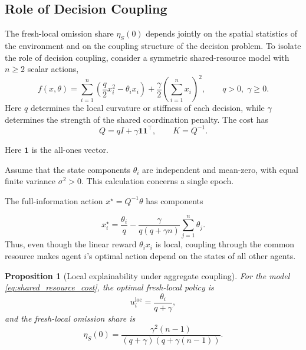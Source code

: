 \documentclass[11pt]{article}
\newtheorem{proposition}{Proposition}
\begin{document}
\subsection{Role of Decision Coupling}
\label{subsec:coupling_example}

The fresh-local omission share $\eta_S(0)$ depends jointly on the
spatial statistics of the environment and on the coupling structure of the
decision problem. To isolate the role of decision coupling, consider a
symmetric shared-resource model with $n\ge2$ scalar actions,
\begin{equation}
    f(x,\theta)
    =
    \sum_{i=1}^{n}
    \left(
        \frac{q}{2}x_i^2-\theta_i x_i
    \right)
    +
    \frac{\gamma}{2}
    \left(
        \sum_{i=1}^{n}x_i
    \right)^2,
    \qquad
    q>0,\;\gamma\ge0.
    \label{eq:shared_resource_cost}
\end{equation}
Here $q$ determines the local curvature or stiffness of each decision, while
$\gamma$ determines the strength of the shared coordination penalty. The cost has
\begin{equation}
    Q
    =
    qI+\gamma\mathbf{1}\mathbf{1}^\top,
    \qquad
    K=Q^{-1}.
    \label{eq:shared_resource_Q}
\end{equation}

Here $\mathbf1$ is the all-ones vector.

Assume that the state components $\theta_i$ are independent and mean-zero,
with equal finite variance $\sigma^2>0$. This calculation concerns a single epoch.

The full-information action $x^\star=Q^{-1}\theta$ has components

\begin{equation}
    x_i^\star
    =
    \frac{\theta_i}{q}
    -
    \frac{\gamma}
    {q(q+\gamma n)}
    \sum_{j=1}^{n}\theta_j.
    \label{eq:shared_resource_xstar}
\end{equation}
Thus, even though the linear reward $\theta_i x_i$ is local, coupling through
the common resource makes agent $i$'s optimal action depend on the states of
all other agents.

\begin{proposition}[Local explainability under aggregate coupling]
\label{prop:aggregate_local}
For the model \eqref{eq:shared_resource_cost}, the optimal fresh-local policy
is
\begin{equation}
    u_i^{\mathrm{loc}}
    =
    \frac{\theta_i}{q+\gamma},
    \label{eq:optimal_local_shared}
\end{equation}
and the fresh-local omission share is
\begin{equation}
    \boxed{
    \eta_S(0)
    =
    \frac{
        \gamma^2(n-1)
    }{
        (q+\gamma)
        \left(
            q+\gamma(n-1)
        \right)
    }.
    }
    \label{eq:aggregate_eta}
\end{equation}
\end{proposition}
\end{document}
